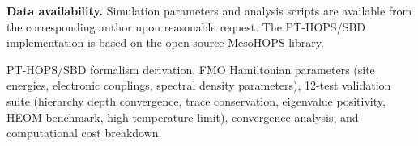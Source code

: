 \documentclass[journal=jpcl,manuscript=letter]{achemso}
\begin{document}

\textbf{Data availability.} Simulation parameters and analysis scripts are available from the corresponding author upon reasonable request. The PT-HOPS/SBD implementation is based on the open-source MesoHOPS library.


\begin{suppinfo}
PT-HOPS/SBD formalism derivation, FMO Hamiltonian parameters (site energies, electronic couplings, spectral density parameters), 12-test validation suite (hierarchy depth convergence, trace conservation, eigenvalue positivity, HEOM benchmark, high-temperature limit), convergence analysis, and computational cost breakdown.
\end{suppinfo}



\end{document}
